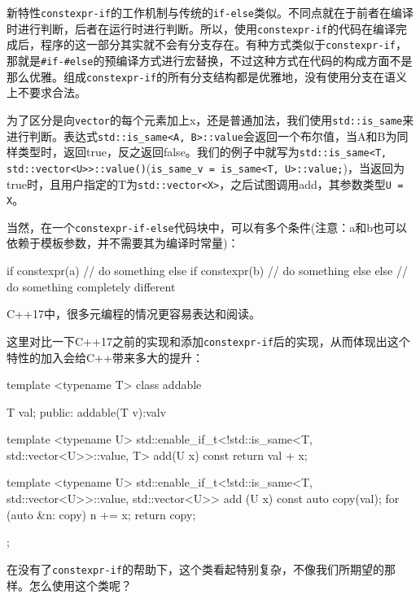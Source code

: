 
新特性\texttt{constexpr-if}的工作机制与传统的\texttt{if-else}类似。不同点就在于前者在编译时进行判断，后者在运行时进行判断。所以，使用\texttt{constexpr-if}的代码在编译完成后，程序的这一部分其实就不会有分支存在。有种方式类似于\texttt{constexpr-if}，那就是\texttt{\#if-\#else}的预编译方式进行宏替换，不过这种方式在代码的构成方面不是那么优雅。组成\texttt{constexpr-if}的所有分支结构都是优雅地，没有使用分支在语义上不要求合法。

为了区分是向\texttt{vector}的每个元素加上x，还是普通加法，我们使用\texttt{std::is\_same}来进行判断。表达式\texttt{std::is\_same<A, B>::value}会返回一个布尔值，当A和B为同样类型时，返回true，反之返回false。我们的例子中就写为\texttt{std::is\_same<T, std::vector<U>>::value()}(\texttt{is\_same\_v = is\_same<T, U>::value;})，当返回为true时，且用户指定的T为\texttt{std::vector<X>}，之后试图调用add，其参数类型\texttt{U = X}。

当然，在一个\texttt{constexpr-if-else}代码块中，可以有多个条件(注意：a和b也可以依赖于模板参数，并不需要其为编译时常量)：

\begin{codebox}[cpp]
if constexpr(a){
    // do something
} else if constexpr(b){
    // do something else
} else {
    // do something completely different
}
\end{codebox}

C++17中，很多元编程的情况更容易表达和阅读。


这里对比一下C++17之前的实现和添加\texttt{constexpr-if}后的实现，从而体现出这个特性的加入会给C++带来多大的提升：

\begin{codebox}[cpp]
template <typename T>
class addable{
    T val;
public:
    addable(T v):val{v}{}
    
    template <typename U>
    std::enable_if_t<!std::is_same<T, std::vector<U>>::value, T> 
    add(U x) const {
        return val + x;
    }
    
    template <typename U>
    std::enable_if_t<!std::is_same<T, std::vector<U>>::value, std::vector<U>>
    add (U x) const{
        auto copy(val);
        for (auto &n: copy){
            n += x;
        }
        return copy;
    }
};
\end{codebox}

在没有了\texttt{constexpr-if}的帮助下，这个类看起特别复杂，不像我们所期望的那样。怎么使用这个类呢？


